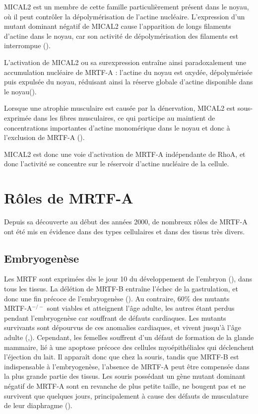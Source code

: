 \documentclass{report}
\begin{document}
MICAL2 est un membre de cette famille particulièrement présent dans le noyau, où il peut contrôler la dépolymérisation de l'actine nucléaire. L'expression d'un mutant dominant négatif de MICAL2 cause l'apparition de longs filaments d'actine dans le noyau, car son activité de dépolymérisation des filaments est interrompue (\cite{lundquist_redox_2014}). 

L'activation de MICAL2 ou sa surexpression entraîne ainsi paradoxalement une accumulation nucléaire de MRTF-A : l'actine du noyau est oxydée, dépolymérisée puis expulsée du noyau, réduisant ainsi la réserve globale d'actine disponible dans le noyau(\cite{lundquist_redox_2014}). 

Lorsque une atrophie musculaire est causée par la dénervation, MICAL2 est sous-exprimée dans les fibres musculaires, ce qui participe au maintient de concentrations importantes d'actine monomérique dans le noyau et donc à l'exclusion de MRTF-A (\cite{collard_nuclear_2014}). 

MICAL2 est donc une voie d'activation de MRTF-A indépendante de RhoA, et donc l'activité se concentre sur le réservoir d'actine nucléaire de la cellule. 


\section{Rôles de MRTF-A}
Depuis sa découverte au début des années 2000, de nombreux rôles de MRTF-A ont été mis en évidence dans des types cellulaires et dans des tissus très divers. 
\subsection{Embryogenèse}

Les MRTF sont exprimées dès le jour 10 du développement de l'embryon (\cite{wang_potentiation_2002}), dans tous les tissus. La délétion de MRTF-B entraîne l'échec de la gastrulation, et donc une fin précoce de l'embryogenèse (\cite{kalita_mkls:_2012}). Au contraire, 60\% des mutants MRTF-A$^{-/-}$ sont viables et atteignent l'âge adulte, les autres étant perdus pendant l'embryogenèse car souffrant de défauts cardiaques. Les mutants survivants sont dépourvus de ces anomalies cardiaques, et vivent jusqu'à l'âge adulte (\cite{li_requirement_2006},\cite{sun_acute_2006}). Cependant, les femelles souffrent d'un défaut de formation de la glande mammaire,  lié à une apoptose précoce des cellules myoépithéliales qui déclenchent l'éjection du lait. Il apparaît donc que chez la souris, tandis que MRTF-B est indispensable à l'embryogenèse, l'absence de MRTF-A peut être compensée dans la plus grande partie des tissus. 
Les souris possédant un gène mutant dominant négatif de MRTF-A sont en revanche de plus petite taille, ne bougent pas et ne survivent que quelques jours, principalement à cause des défauts de musculature de leur diaphragme (\cite{li_requirement_2005}). 
\end{document}
